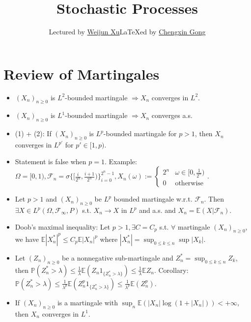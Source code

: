 \documentclass[UTF8]{ctexart}
\theoremstyle{plain}
\theoremstyle{nonumberplain}
\numberwithin{equation}{section} %
\renewcommand{\t}{\text}
\newcommand{\EE}{\mathbb{E}}
\newcommand{\scr}{\mathscr}
\renewcommand{\P}{\mathbb{P}}
\begin{document}
\title{\Huge Stochastic Processes}

\author{Lectured by \href{mailto:weijunxu@bicmr.pku.edu.cn}{Weijun Xu}\qquad\qquad\LaTeX ed by \href{https://wqgcx.github.io/}{Chengxin Gong}}

\maketitle %

\tableofcontents

\newpage
\section{Review of Martingales}
\begin{itemize}
  \item $(X_n)_{n\geq 0}$ is $L^2$-bounded martingale $\Rightarrow X_n$ converges in $L^2$.
  \item $(X_n)_{n\geq 0}$ is $L^1$-bounded martingale $\Rightarrow X_n$ converges a.s.
  \item (1) + (2): If $(X_n)_{n\geq 0}$ is $L^p$-bounded martingale for $p>1$, then $X_n$ converges in $L^{p'}$ for $p'\in[1,p)$.
  \item Statement is false when $p=1$. Example: $\Omega=[0,1),\scr{F}_n=\sigma\{[\frac{i}{2^n},\frac{i+1}{2^n})\}_{i=0}^{2^n-1},X_n(\omega):=\begin{cases}
    2^n&\omega\in[0,\frac{1}{2^n})\\0&\t{otherwise}
  \end{cases}$.
  \item Let $p>1$ and $(X_n)_{n\geq 0}$ be $L^p$ bounded martingale w.r.t. $\scr{F}_n$. Then $\exists X\in L^p(\Omega,\scr{F}_{\infty},P)$ s.t. $X_n\to X$ in $L^p$ and a.s. and $X_n=\EE(X|\scr{F}_n)$.
  \item Doob's maximal inequality: Let $p>1,\exists C=C_p$ s.t. $\forall$ martingale $(X_n)_{n\geq 0}$, we have $\EE|X_n^*|^p\leq C_p\EE|X_n|^p$ where $|X_n^*|=\sup_{0\leq k\leq n}\sup|X_k|$.
  \item Let $(Z_n)_{n\geq 0}$ be a nonnegative sub-martingale and $Z_n^*=\sup_{0\leq k\leq n}Z_k$, then $\P(Z_n^*>\lambda)\leq\frac{1}{\lambda}\EE(Z_n1_{\{Z_n^*>\lambda\}})\leq\frac{1}{\lambda}\EE Z_n$. Corollary: $\P(Z_n^*>\lambda)\leq\frac{1}{\lambda^p}\EE(Z_n^p1_{\{Z_n^*>\lambda\}})\leq\frac{1}{\lambda^p}\EE(Z_n^p)$.
  \item If $(X_n)_{n\geq 0}$ is a martingale with $\sup_n\EE(|X_n|\log(1+|X_n|))<+\infty$, then $X_n$ converges in $L^1$.

\end{itemize}
\end{document}
